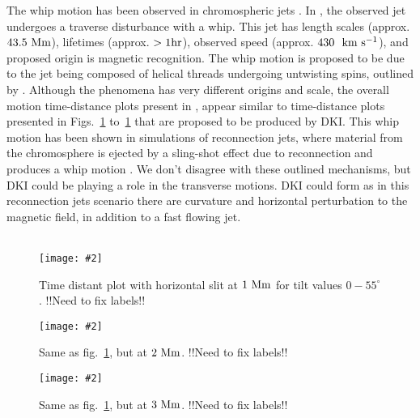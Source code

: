 \documentclass[12pt]{ociamthesis}
\newcommand{\mfig}[4]{
  \begin{figure}
  \begin{center}
  \texttt{[image: \#2]}
  \caption{#3}
  \label{#4}
  \end{center}
  \end{figure}}
\newcommand{\kms}{~\rm{km ~s^{-1}}}
\newcommand{\np}{\\ \\}
\begin{document}
The whip motion has been observed in chromospheric jets \citep{Liu2009ApJ707L37L}. In \cite{Liu2009ApJ707L37L}, the observed jet undergoes a traverse disturbance with a whip. This jet has length scales (approx. $43.5~\rm{Mm}$), lifetimes (approx. $>1\rm{hr}$), observed speed (approx. $430~\kms$), and proposed origin is magnetic recognition. The whip motion is proposed to be due to the jet being composed of helical threads undergoing untwisting spins, outlined by \cite{Shibata1985PASJ3731S, Shibata1986SoPh103299S, Canfield1996ApJ4641016C}. Although the phenomena has very different origins and scale, the overall motion time-distance plots present in \cite{Liu2009ApJ707L37L}, appear similar to time-distance plots presented in Figs.~\ref{td_plot_1Mm} to~\ref{td_plot_1Mm} that are proposed to be produced by DKI. This whip motion has been shown in simulations of reconnection jets, where material from the chromosphere is ejected by a sling-shot effect due to reconnection and produces a whip motion \citep{Yokoyama1996PASJ48353Y, Kotani2020PASJ7275K}. We don't disagree with these outlined mechanisms, but DKI could be playing a role in the transverse motions. DKI could form as in this reconnection jets scenario there are curvature and horizontal perturbation to the magnetic field, in addition to a fast flowing jet. \np
\mfig{1}{figures/td_plot_1Mm.png}{Time distant plot with horizontal slit at $1~\rm{Mm}$ for tilt values $0-55^{\circ}$.{\color{green} !!Need to fix labels!!}}{td_plot_1Mm}
%
\mfig{1}{figures/td_plot_2Mm.png}{Same as fig.~\ref{td_plot_1Mm}, but at $2~\rm{Mm}$. {\color{green} !!Need to fix labels!!}}{td_plot_2Mm}
\mfig{1}{figures/td_plot_3Mm.png}{Same as fig.~\ref{td_plot_1Mm}, but at $3~\rm{Mm}$. {\color{green} !!Need to fix labels!!}}{td_plot_3Mm}
\end{document}

